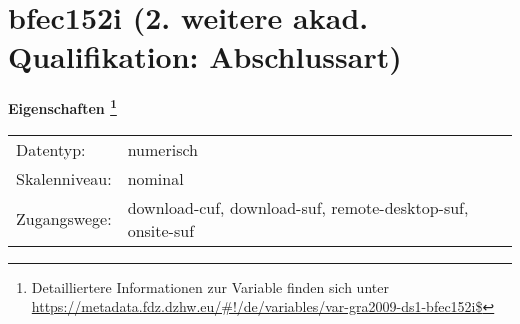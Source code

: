 
    \setcounter{footnote}{0}

    \vspace*{-1.8cm}
	\section{bfec152i (2. weitere akad. Qualifikation: Abschlussart)}
	\label{section:bfec152i}



    \vspace*{0.5cm}
    \noindent\textbf{Eigenschaften
	\footnote{Detailliertere Informationen zur Variable finden sich unter
		\url{https://metadata.fdz.dzhw.eu/\#!/de/variables/var-gra2009-ds1-bfec152i$}}}\\
	\begin{tabularx}{\hsize}{@{}lX}
	Datentyp: & numerisch \\
	Skalenniveau: & nominal \\
	Zugangswege: &
	  download-cuf, 
	  download-suf, 
	  remote-desktop-suf, 
	  onsite-suf
 \\
    \end{tabularx}



